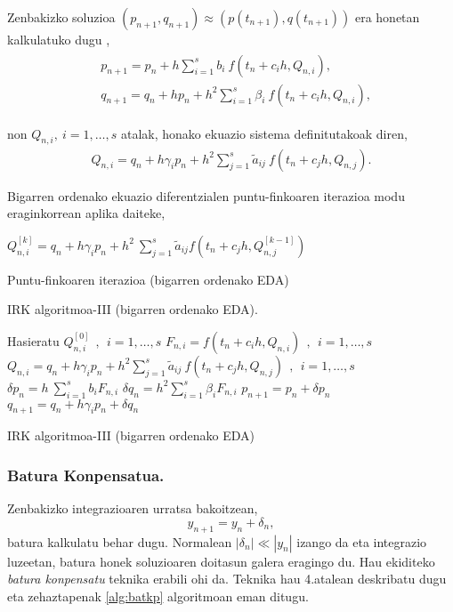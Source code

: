 Zenbakizko soluzioa $(p_{n+1},q_{n+1}) \approx (p(t_{n+1}),q(t_{n+1}))$ era honetan kalkulatuko dugu \cite{JMSanz-Serna1994},
\begin{align}
\begin{split}
&p_{n+1}=p_n+ h \sum\limits_{i=1}^{s} b_i \ f(t_n+c_ih,Q_{n,i}),\\
&q_{n+1}=q_n+ h p_{n} + h^2 \sum\limits_{i=1}^{s} \beta_i \ f(t_n+c_ih,Q_{n,i}),
\end{split}
\end{align}

non $Q_{n,i}, \ i=1,\dots,s$ atalak, honako ekuazio sistema definitutakoak diren, 
\begin{align}
Q_{n,i}=q_n+ h\gamma_i p_n+ h^2 \sum\limits_{j=1}^{s} \tilde{a}_{ij} \ f(t_n+c_jh,Q_{n,j}).
\end{align}

Bigarren ordenako ekuazio diferentzialen puntu-finkoaren iterazioa modu eraginkorrean aplika daiteke,

\begin{algorithm}[H]
  {
   $Q_{n,i}^{[k]}=q_{n}+h \gamma_i p_{n}+ h^2 \ \sum\limits_{j=1}^{s} \tilde{a}_{ij} f(t_n+c_jh,Q_{n,j}^{[k-1]}) $\;  
  }
 \caption{Puntu-finkoaren iterazioa (bigarren ordenako EDA)}
\end{algorithm} 

IRK algoritmoa-III (bigarren ordenako EDA).

\begin{algorithm}[H]
 \BlankLine
  {
   \BlankLine
   Hasieratu  $Q_{n,i}^{[0]} \ \ , \ \ i=1,\dots,s $\;
    \BlankLine
   {
    \BlankLine 
    $F_{n,i}=f(t_n+c_ih,Q_{n,i}) \ \ , \ \  i=1,\dots,s$\;
    $Q_{n,i}=q_n+ h\gamma_i p_n+ h^2 \sum\limits_{j=1}^{s} \tilde{a}_{ij} \ f(t_n+c_jh,Q_{n,j}) \ \ , \ \  i=1,\dots,s$\;  
   }
   \BlankLine
    $\delta p_n=h \ \sum\limits_{i=1}^{s} b_i F_{n,i}$\;
    $\delta q_n=h^2 \sum\limits_{i=1}^{s} \beta_i F_{n,i}$\;    
    $p_{n+1}=p_{n}+ \delta p_n $\;
    $q_{n+1}=q_{n}+ h\gamma_i p_n+\delta q_n $\;
   \BlankLine
 }
 \caption{IRK algoritmoa-III (bigarren ordenako EDA)}\label{alg:IRK2}
\end{algorithm}


\subsubsection*{Batura Konpensatua.}

Zenbakizko integrazioaren urratsa bakoitzean,
\begin{equation*}
y_{n+1}=y_{n}+ \delta_n,
\end{equation*}
batura kalkulatu behar dugu. Normalean $|\delta_n| \ll |y_n| $ izango da eta integrazio luzeetan, batura honek soluzioaren doitasun galera eragingo du. Hau ekiditeko \emph{batura konpensatu}  teknika \cite{Muller2009,Higham2002,Hairer2006} erabili ohi da. Teknika hau 4.atalean deskribatu dugu eta zehaztapenak \ref{alg:batkp} algoritmoan eman ditugu.
 

